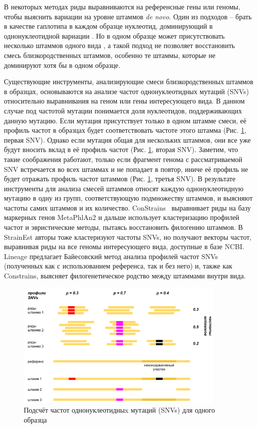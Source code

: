 \documentclass{spbau-diploma}
\begin{document}
В некоторых методах риды выравниваются на референсные гены или геномы, чтобы выяснить вариации на уровне штаммов \textit{de novo}. Один из подходов -- брать в качестве гаплотипа в каждом образце нуклеотид, доминирующий в однонуклеотидной вариации \cite{ref_based2, ref_based1}. Но в одном образце может присутствовать несколько штаммов одного вида \cite{StrainEst, metasub, infant_gut}, а такой подход не позволяет восстановить смесь близкородственных штаммов, особенно те штаммы, которые не доминируют хотя бы в одном образце.

Существующие инструменты, анализирующие смеси близкородственных штаммов в образцах, основываются на анализе частот однонуклеотидных мутаций (SNVs) относительно выравнивания на геном или гены интересующего вида. В данном случае под частотой мутации понимается доля нуклеотидов, поддерживающих данную мутацию. Если мутация присутствует только в одном штамме смеси, её профиль частот в образцах будет соответствовать частоте этого штамма (Рис. \ref{snv_profile}, первая SNV). Однако если мутация общая для нескольких штаммов, они все уже будут вносить вклад в её профиль частот (Рис. \ref{snv_profile}, вторая SNV). Заметим, что такие соображения работают, только если фрагмент генома с рассматриваемой SNV встречается во всех штаммах и не попадает в повтор, иниче её профиль не будет отражать профиль частот штаммов (Рис. \ref{snv_profile}, третья SNV). В результате инструменты для анализа смесей штаммов относят каждую однонуклеотидную мутацию в одну из групп, соответствующую подмножеству штаммов, и выясняют частоты самих штаммов и их количество. ConStrains~\cite{Constrains} выравнивает риды на базу маркерных генов MetaPhlAn2 \cite{MetaPhlAn2} и дальше использует кластеризацию профилей частот и эвристические методы, пытаясь восстановить филогению штаммов. В StrainEst \cite{StrainEst} авторы тоже кластеризуют частоты SNVs, но получают векторы частот, выравнивая риды на все геномы интересующего вида, доступные в базе NCBI. Lineage \cite{Lineage} предлагает Байесовский метод анализа профилей частот SNVs (полученных как с использованием референса, так и без него) и, также как Constrains, выясняет филогенетическое родство между штаммами внутри вида.

\begin{figure}[t]
\centering
\includegraphics[width=0.9\textwidth]{pics/snv_profiles.png}
\caption{Подсчёт частот однонуклеотидныx мутаций (SNVs) для одного образца}
\label{snv_profile}
\end{figure}
\end{document}
